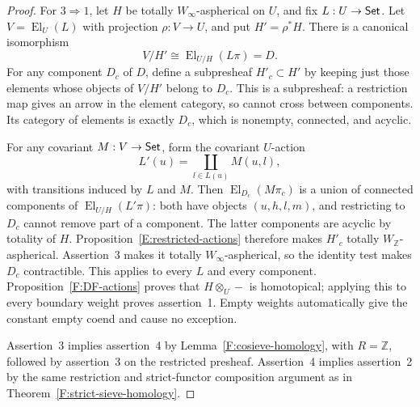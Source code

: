 \begin{proof}
For $3\Rightarrow1$, let $H$ be totally $W_\infty$-aspherical
on $U$, and fix $L:U\to\mathsf{Set}$. Let $V=\operatorname{El}_U(L)$
with projection $\rho:V\to U$, and put $H'=\rho^*H$.
There is a canonical isomorphism
\[
 V/H'\cong\operatorname{El}_{U/H}(L\pi)=D.
\]
For any component $D_c$ of $D$, define a subpresheaf
$H'_c\subset H'$ by keeping just those elements whose objects
of $V/H'$ belong to $D_c$. This is a subpresheaf: a restriction
map gives an arrow in the element category, so cannot cross
between components. Its category of elements is exactly $D_c$,
which is nonempty, connected, and acyclic.

For any covariant $M:V\to\mathsf{Set}$, form the covariant $U$-action
\[
 L'(u)=\coprod_{l\in L(u)}M(u,l),
\]
with transitions induced by $L$ and $M$. Then
$\operatorname{El}_{D_c}(M\pi_c)$ is a union of connected
components of $\operatorname{El}_{U/H}(L'\pi)$: both have
objects $(u,h,l,m)$, and restricting to $D_c$ cannot remove
part of a component. The latter components are acyclic by
totality of $H$. Proposition~\ref{E:restricted-actions}
therefore makes $H'_c$ totally $W_{\mathbb Z}$-aspherical.
Assertion~3 makes it totally $W_\infty$-aspherical, so the
identity test makes $D_c$ contractible. This applies to every
$L$ and every component. Proposition~\ref{F:DF-actions}
proves that $H\otimes_U-$ is homotopical; applying this to
every boundary weight proves assertion~1. Empty weights
automatically give the constant empty coend and cause no
exception.

Assertion~3 implies assertion~4 by
Lemma~\ref{F:cosieve-homology}, with $R=\mathbb Z$, followed
by assertion~3 on the restricted presheaf. Assertion~4 implies
assertion~2 by the same restriction and strict-functor
composition argument as in
Theorem~\ref{F:strict-sieve-homology}.


\end{proof}
